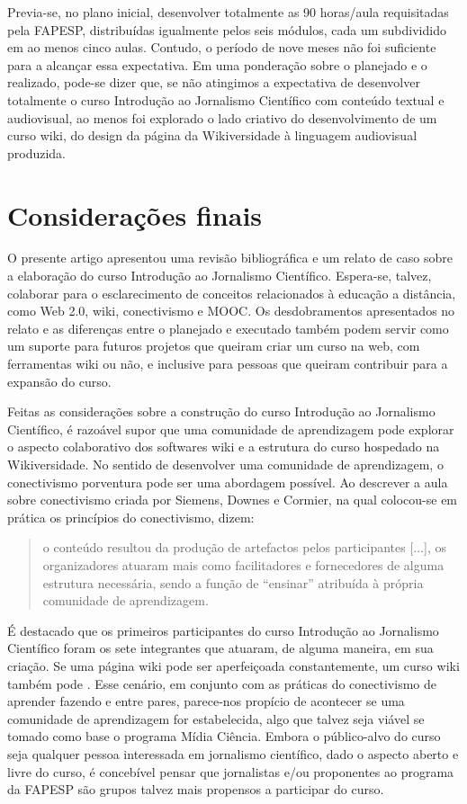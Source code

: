\documentclass{textolivre}
\begin{document}
Previa-se, no plano inicial, desenvolver totalmente as 90 horas/aula requisitadas pela FAPESP, distribuídas igualmente pelos seis módulos, cada um subdividido em ao menos cinco aulas. Contudo, o período de nove meses não foi suficiente para a alcançar essa expectativa. Em uma ponderação sobre o planejado e o realizado, pode-se dizer que, se não atingimos a expectativa de desenvolver totalmente o curso Introdução ao Jornalismo Científico com conteúdo textual e audiovisual, ao menos foi explorado o lado criativo do desenvolvimento de um curso wiki, do design da página da Wikiversidade à linguagem audiovisual produzida. 

\section{Considerações finais}\label{sec-consideracoes}

O presente artigo apresentou uma revisão bibliográfica e um relato de caso sobre a elaboração do curso Introdução ao Jornalismo Científico. Espera-se, talvez, colaborar para o esclarecimento de conceitos relacionados à educação a distância, como Web 2.0, wiki, conectivismo e MOOC. Os desdobramentos apresentados no relato e as diferenças entre o planejado e executado também podem servir como um suporte para futuros projetos que queiram criar um curso na web, com ferramentas wiki ou não, e inclusive para pessoas que queiram contribuir para a expansão do curso. 

Feitas as considerações sobre a construção do curso Introdução ao Jornalismo Científico, é razoável supor que uma comunidade de aprendizagem pode explorar o aspecto colaborativo dos softwares wiki e a estrutura do curso hospedado na Wikiversidade. No sentido de desenvolver uma comunidade de aprendizagem, o conectivismo porventura pode ser uma abordagem possível. Ao descrever a aula sobre conectivismo criada por Siemens, Downes e Cormier, na qual colocou-se em prática os princípios do conectivismo, \textcite[p. 5]{teixeira2015} dizem: 

\begin{quote}
o conteúdo resultou da produção de artefactos pelos participantes [...], os organizadores atuaram mais como facilitadores e fornecedores de alguma estrutura necessária, sendo a função de “ensinar” atribuída à própria comunidade de aprendizagem.
\end{quote}
	
É destacado que os primeiros participantes do curso Introdução ao Jornalismo Científico foram os sete integrantes que atuaram, de alguma maneira, em sua criação. Se uma página wiki pode ser aperfeiçoada constantemente, um curso wiki também pode \cite[p. 93]{zhang2009}. Esse cenário, em conjunto com as práticas do conectivismo de aprender fazendo e entre pares, parece-nos propício de acontecer se uma comunidade de aprendizagem for estabelecida, algo que talvez seja viável se tomado como base o programa Mídia Ciência. Embora o público-alvo do curso seja qualquer pessoa interessada em jornalismo científico, dado o aspecto aberto e livre do curso, é concebível pensar que jornalistas e/ou proponentes ao programa da FAPESP são grupos talvez mais propensos a participar do curso.
\end{document}
